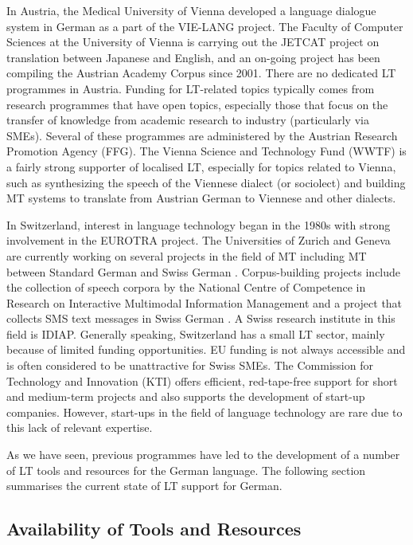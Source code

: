 \documentclass[]{../../metanetpaper}
\begin{document}
\begin{multicols}{2}
    In Austria, the Medical University of Vienna developed a language dialogue system in German as a part of the VIE-LANG project. The Faculty of Computer Sciences at the University of Vienna is carrying out the JETCAT project on translation between Japanese and English, and an on-going project has been compiling the Austrian Academy Corpus since 2001. There are no dedicated LT programmes in Austria. Funding for LT-related topics typically comes from research programmes that have open topics, especially those that focus on the transfer of knowledge from academic research to industry (particularly via SMEs). Several of these programmes are administered by the Austrian Research Promotion Agency (FFG). The Vienna Science and Technology Fund (WWTF) is a fairly strong supporter of localised LT, especially for topics related to Vienna, such as synthesizing the speech of the Viennese dialect (or sociolect) and building MT systems to translate from Austrian German to Viennese and other dialects.

    In Switzerland, interest in language technology began in the 1980s with strong involvement in the EUROTRA project. The Universities of Zurich and Geneva are currently working on several projects in the field of MT including MT between Standard German and Swiss German \cite{latl1}. Corpus-building projects include the collection of speech corpora by the National Centre of Competence in Research on Interactive Multimodal Information Management and a project that collects SMS text messages in Swiss German \cite{sor1}. A Swiss research institute in this field is IDIAP. Generally speaking, Switzerland has a small LT sector, mainly because of limited funding opportunities. EU funding is not always accessible and is often considered to be unattractive for Swiss SMEs. The Commission for Technology and Innovation (KTI) offers efficient, red-tape-free support for short and medium-term projects and also supports the development of start-up companies. However, start-ups in the field of language technology are rare due to this lack of relevant expertise.

As we have seen, previous programmes have led to the development of a number of LT tools and resources for the German language. The following section summarises the current state of LT support for German.
  
\subsection{Availability of Tools and Resources}


\end{multicols}
\end{document}
